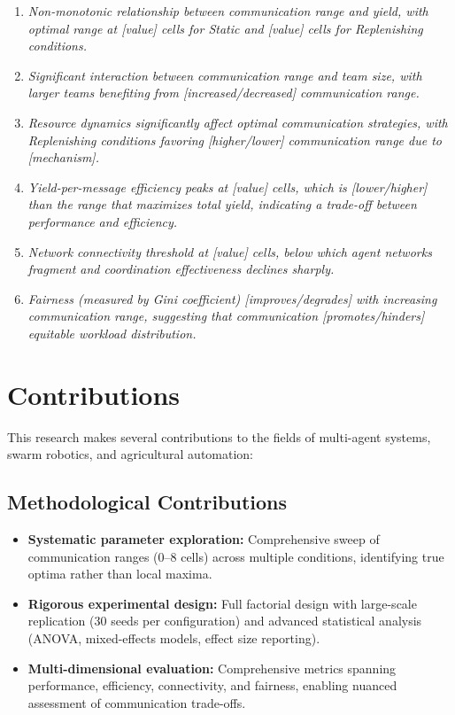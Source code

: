\begin{enumerate}
    \item \textit{Non-monotonic relationship between communication range and yield, with optimal range at [value] cells for Static and [value] cells for Replenishing conditions.}
    
    \item \textit{Significant interaction between communication range and team size, with larger teams benefiting from [increased/decreased] communication range.}
    
    \item \textit{Resource dynamics significantly affect optimal communication strategies, with Replenishing conditions favoring [higher/lower] communication range due to [mechanism].}
    
    \item \textit{Yield-per-message efficiency peaks at [value] cells, which is [lower/higher] than the range that maximizes total yield, indicating a trade-off between performance and efficiency.}
    
    \item \textit{Network connectivity threshold at [value] cells, below which agent networks fragment and coordination effectiveness declines sharply.}
    
    \item \textit{Fairness (measured by Gini coefficient) [improves/degrades] with increasing communication range, suggesting that communication [promotes/hinders] equitable workload distribution.}
\end{enumerate}

\section{Contributions}

This research makes several contributions to the fields of multi-agent systems, swarm robotics, and agricultural automation:

\subsection{Methodological Contributions}

\begin{itemize}
    \item \textbf{Systematic parameter exploration:} Comprehensive sweep of communication ranges (0--8 cells) across multiple conditions, identifying true optima rather than local maxima.
    
    \item \textbf{Rigorous experimental design:} Full factorial design with large-scale replication (30 seeds per configuration) and advanced statistical analysis (ANOVA, mixed-effects models, effect size reporting).
    
    \item \textbf{Multi-dimensional evaluation:} Comprehensive metrics spanning performance, efficiency, connectivity, and fairness, enabling nuanced assessment of communication trade-offs.
\end{itemize}

